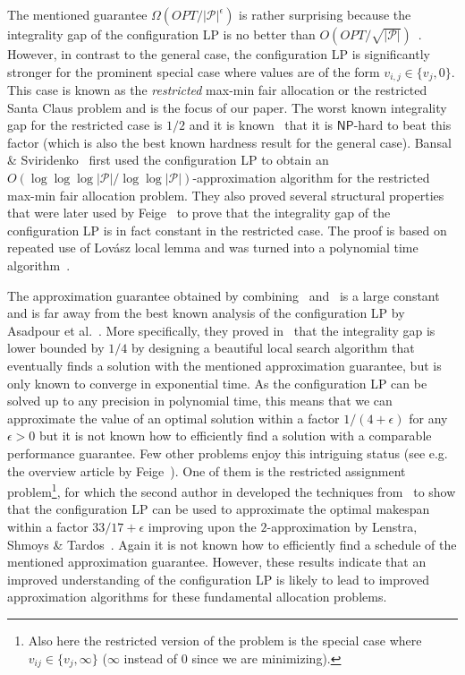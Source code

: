 \documentclass{llncs}
\newcommand{\players}{\ensuremath{\mathcal{P}}\xspace}
\begin{document}
The mentioned guarantee $\Omega(OPT/|\players|^\epsilon)$ is rather
surprising because the integrality gap of the configuration LP is no
better than $O(OPT/\sqrt{|\players|})$~\cite{BS06}. However, in
contrast to the general case, the configuration LP is significantly
stronger for the prominent special case where values are of the form
$v_{i,j} \in \{v_j, 0\}$. This case is known as the \emph{restricted}
max-min fair allocation or the restricted Santa Claus problem and is the focus of our
paper. The worst known integrality gap for the restricted case is
$1/2$ and it is known~\cite{BD05} that it is $\mathsf{NP}$-hard to beat
this factor (which is also the best known hardness result for the
general case).
Bansal \& Sviridenko~\cite{BS06} first used the configuration LP to
obtain an $O(\log\log \log |\players| / \log \log
|\players|)$-approximation algorithm for the restricted max-min fair
allocation problem. They also proved several structural properties
that were later used by Feige~\cite{Feige08} to prove that the
integrality gap of the configuration LP is in fact constant in the
restricted case. The proof is based on repeated use of Lov\'{a}sz
local lemma and was turned into a polynomial time algorithm~\cite{HSS10}.

The approximation guarantee obtained by combining~\cite{Feige08}
and~\cite{HSS10} is a large constant and is far away from the best
known analysis of the configuration LP by Asadpour et
al.~\cite{AFS08}.
More specifically, they proved in~\cite{AFS08} that the integrality
gap is lower bounded by $1/4$ by designing a beautiful local search
algorithm that eventually finds a solution with the mentioned
approximation guarantee, but is only known to converge in exponential
time.  As the configuration LP can be solved up to any precision in
polynomial time, this means that we can approximate the value of an
optimal solution within a factor $1/(4+\epsilon)$ for any $\epsilon
>0$ but it is not known how to efficiently find a solution with a
comparable performance guarantee. Few other problems enjoy this
intriguing status (see e.g. the overview article by
Feige~\cite{FeigeSurv08}). One of them is the restricted assignment
problem\footnote{Also here the restricted version of the  problem is the special case where $v_{ij} \in \{v_j, \infty\}$ ($\infty$ instead of $0$ since we are minimizing).},
  for which the second author in \cite{SME11} developed the techniques
from~\cite{AFS08} to show that the configuration LP can be used to
approximate the optimal makespan within a factor $33/17 + \epsilon$
improving upon the $2$-approximation by Lenstra, Shmoys \&
Tardos~\cite{LST90}. Again it is not known how to efficiently find a
schedule of the mentioned approximation guarantee. However, these
results indicate that an improved understanding of the configuration
LP is likely to lead to improved approximation algorithms for these
fundamental allocation problems.
\end{document}
